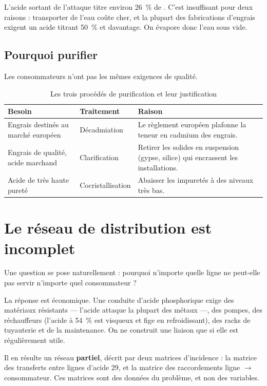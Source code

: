 L'acide sortant de l'attaque titre environ \SI{26}{\percent} de \PdeuxOcinq{}. C'est
insuffisant pour deux raisons : transporter de l'eau coûte cher, et la plupart des
fabrications d'engrais exigent un acide titrant \SI{50}{\percent} et davantage. On évapore
donc l'eau sous vide.

\subsection{Pourquoi purifier}

Les consommateurs n'ont pas les mêmes exigences de qualité.

\begin{table}[H]
\centering
\caption{Les trois procédés de purification et leur justification}
\label{tab:pourquoi-purifier}
\begin{tabular}{@{}p{4.2cm}p{3.2cm}p{6.4cm}@{}}
\toprule
\textbf{Besoin} & \textbf{Traitement} & \textbf{Raison} \\
\midrule
Engrais destinés au marché européen & Décadmiation &
Le règlement européen plafonne la teneur en cadmium des engrais. \\
\addlinespace
Engrais de qualité, acide marchand & Clarification &
Retirer les solides en suspension (gypse, silice) qui encrassent les installations. \\
\addlinespace
Acide de très haute pureté & Cocristallisation &
Abaisser les impuretés à des niveaux très bas. \\
\bottomrule
\end{tabular}
\end{table}

\section{Le réseau de distribution est incomplet}

Une question se pose naturellement : pourquoi n'importe quelle ligne ne peut-elle pas servir
n'importe quel consommateur ?

La réponse est économique. Une conduite d'acide phosphorique exige des matériaux résistants
--- l'acide attaque la plupart des métaux ---, des pompes, des réchauffeurs (l'acide à
\SI{54}{\percent} est visqueux et fige en refroidissant), des racks de tuyauterie et de la
maintenance. On ne construit une liaison que si elle est régulièrement utile.

Il en résulte un réseau \textbf{partiel}, décrit par deux matrices d'incidence : la matrice
des transferts entre lignes d'acide 29, et la matrice des raccordements ligne
$\to$ consommateur. Ces matrices sont des données du problème, et non des variables.


